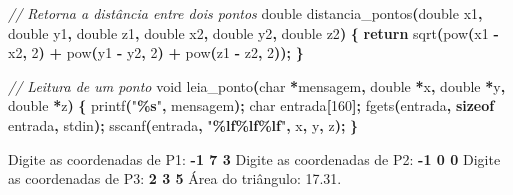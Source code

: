 \documentclass[
  11pt,
  a4paper,
]{scrbook}
\newenvironment{Shaded}{\begin{snugshade}}{\end{snugshade}}
\newcommand{\CommentTok}[1]{\textcolor[rgb]{0.56,0.35,0.01}{\textit{#1}}}
\newcommand{\ControlFlowTok}[1]{\textcolor[rgb]{0.13,0.29,0.53}{\textbf{#1}}}
\newcommand{\DataTypeTok}[1]{\textcolor[rgb]{0.13,0.29,0.53}{#1}}
\newcommand{\DecValTok}[1]{\textcolor[rgb]{0.00,0.00,0.81}{#1}}
\newcommand{\KeywordTok}[1]{\textcolor[rgb]{0.13,0.29,0.53}{\textbf{#1}}}
\newcommand{\NormalTok}[1]{#1}
\newcommand{\OperatorTok}[1]{\textcolor[rgb]{0.81,0.36,0.00}{\textbf{#1}}}
\newcommand{\SpecialCharTok}[1]{\textcolor[rgb]{0.81,0.36,0.00}{\textbf{#1}}}
\newcommand{\StringTok}[1]{\textcolor[rgb]{0.31,0.60,0.02}{#1}}
\begin{document}
\begin{Shaded}
\begin{Highlighting}[]
\CommentTok{// Retorna a distância entre dois pontos}
\DataTypeTok{double}\NormalTok{ distancia\_pontos}\OperatorTok{(}\DataTypeTok{double}\NormalTok{ x1}\OperatorTok{,} \DataTypeTok{double}\NormalTok{ y1}\OperatorTok{,} \DataTypeTok{double}\NormalTok{ z1}\OperatorTok{,}
                        \DataTypeTok{double}\NormalTok{ x2}\OperatorTok{,} \DataTypeTok{double}\NormalTok{ y2}\OperatorTok{,} \DataTypeTok{double}\NormalTok{ z2}\OperatorTok{)} \OperatorTok{\{}
    \ControlFlowTok{return}\NormalTok{ sqrt}\OperatorTok{(}\NormalTok{pow}\OperatorTok{(}\NormalTok{x1 }\OperatorTok{{-}}\NormalTok{ x2}\OperatorTok{,} \DecValTok{2}\OperatorTok{)} \OperatorTok{+}\NormalTok{ pow}\OperatorTok{(}\NormalTok{y1 }\OperatorTok{{-}}\NormalTok{ y2}\OperatorTok{,} \DecValTok{2}\OperatorTok{)} \OperatorTok{+}\NormalTok{ pow}\OperatorTok{(}\NormalTok{z1 }\OperatorTok{{-}}\NormalTok{ z2}\OperatorTok{,} \DecValTok{2}\OperatorTok{));}
\OperatorTok{\}}

\CommentTok{// Leitura de um ponto}
\DataTypeTok{void}\NormalTok{ leia\_ponto}\OperatorTok{(}\DataTypeTok{char} \OperatorTok{*}\NormalTok{mensagem}\OperatorTok{,} \DataTypeTok{double} \OperatorTok{*}\NormalTok{x}\OperatorTok{,} \DataTypeTok{double} \OperatorTok{*}\NormalTok{y}\OperatorTok{,} \DataTypeTok{double} \OperatorTok{*}\NormalTok{z}\OperatorTok{)} \OperatorTok{\{}
\NormalTok{    printf}\OperatorTok{(}\StringTok{"}\SpecialCharTok{\%s}\StringTok{"}\OperatorTok{,}\NormalTok{ mensagem}\OperatorTok{);}
    \DataTypeTok{char}\NormalTok{ entrada}\OperatorTok{[}\DecValTok{160}\OperatorTok{];}
\NormalTok{    fgets}\OperatorTok{(}\NormalTok{entrada}\OperatorTok{,} \KeywordTok{sizeof}\NormalTok{ entrada}\OperatorTok{,}\NormalTok{ stdin}\OperatorTok{);}
\NormalTok{    sscanf}\OperatorTok{(}\NormalTok{entrada}\OperatorTok{,} \StringTok{"}\SpecialCharTok{\%lf\%lf\%lf}\StringTok{"}\OperatorTok{,}\NormalTok{ x}\OperatorTok{,}\NormalTok{ y}\OperatorTok{,}\NormalTok{ z}\OperatorTok{);}
\OperatorTok{\}}
\end{Highlighting}
\end{Shaded}

\begin{Shaded}
\begin{Highlighting}[]
\NormalTok{Digite as coordenadas de P1: }\KeywordTok{ {-}1 7 3 }
\NormalTok{Digite as coordenadas de P2: }\KeywordTok{ {-}1 0 0 }
\NormalTok{Digite as coordenadas de P3: }\KeywordTok{ 2 3 5 }
\NormalTok{Área do triângulo: 17.31.}
\end{Highlighting}
\end{Shaded}
\end{document}

